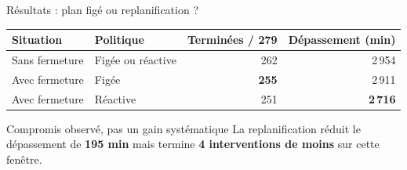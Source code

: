 \begin{frame}{Résultats : plan figé ou replanification ?}
  \small
  \vspace{0.15cm}
  \centering
  \renewcommand{\arraystretch}{1.32}
  \setlength{\tabcolsep}{8pt}
  \begin{tabular}{llrr}
    \toprule
    Situation & Politique & Terminées / 279 & Dépassement (min) \\
    \midrule
    Sans fermeture & Figée ou réactive & 262 & 2\,954 \\
    \midrule
    Avec fermeture & Figée & \textbf{255} & 2\,911 \\
    Avec fermeture & Réactive & 251 & \textbf{2\,716} \\
    \bottomrule
  \end{tabular}
  \vspace{0.35cm}
  \begin{alertblock}{Compromis observé, pas un gain systématique}
    \small La replanification réduit le dépassement de \textbf{195 min}
    mais termine \textbf{4 interventions de moins} sur cette fenêtre.
  \end{alertblock}
\end{frame}

